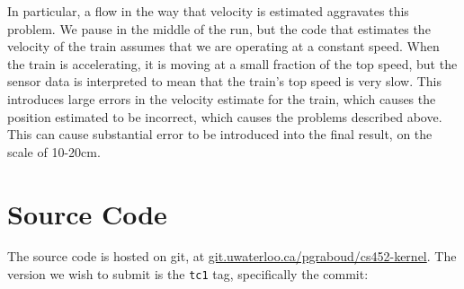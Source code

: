 \documentclass[titlepage]{article}
\begin{document}
In particular, a flow in the way that velocity is estimated aggravates this problem.
We pause in the middle of the run, but the code that estimates the velocity
of the train assumes that we are operating at a constant speed.
When the train is accelerating, it is moving at a small fraction of the top speed,
but the sensor data is interpreted to mean that the train's top speed is
very slow.
This introduces large errors in the velocity estimate for the train, which
causes the position estimated to be incorrect, which causes the problems described
above.
This can cause substantial error to be introduced into the final result, on
the scale of 10-20cm.

\section{Source Code}
The source code is hosted on git, at \url{git.uwaterloo.ca/pgraboud/cs452-kernel}.
The version we wish to submit is the \texttt{tc1} tag, specifically
the commit:

\end{document}
